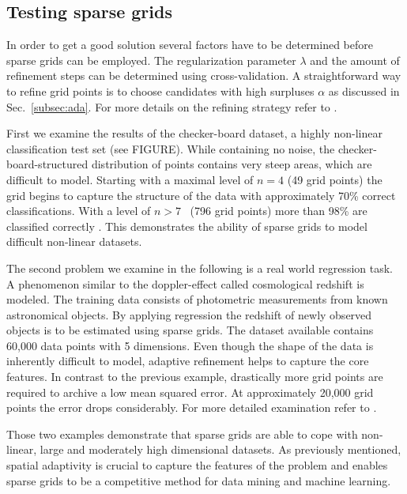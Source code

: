 \subsection{Testing sparse grids}
In order to get a good solution several factors have to be determined before
sparse grids can be employed. The regularization parameter $\lambda$ and the
amount of refinement steps can be determined using cross-validation.
A straightforward way to refine grid points is to choose candidates
with high surpluses $\alpha$ as discussed in Sec.~\ref{subsec:ada}. For more
details on the refining strategy refer to \cite{disspfl}.
\par
First we examine the results of the checker-board dataset, a highly non-linear
classification test set (see FIGURE).
While containing no noise, the checker-board-structured
distribution of points contains very steep areas, which are difficult to model.
Starting with a maximal level of $n=4$ (49 grid points)
the grid begins to capture the structure of the data with approximately
70\% correct classifications.
With a level of $n>7$ \ (796 grid points) more than 98\% are classified
correctly \cite{disspfl}. This demonstrates the ability of sparse grids
to model difficult non-linear datasets.
\par
The second problem we examine in the following is a real world regression
task.
A phenomenon similar to the doppler-effect called cosmological redshift
is modeled. The training data consists of photometric measurements from known
astronomical objects. By applying regression the redshift of
newly observed objects is to be estimated using sparse grids.
The dataset available contains 60,000 data points with 5 dimensions. Even though
the shape of the data is inherently difficult to model, adaptive refinement
helps to capture the core features. In contrast to the previous
example, drastically more grid points are required to archive a low mean
squared error. At approximately 20,000 grid points the error drops
considerably. For more detailed examination refer to \cite{disspfl}.
\par
Those two examples demonstrate that sparse grids are able to cope with
non-linear, large and moderately high dimensional datasets. As previously
mentioned, spatial adaptivity is crucial to capture the features of the
problem and enables sparse grids to be a competitive method for data mining
and machine learning.



